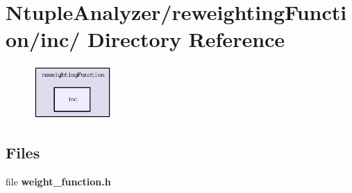\section{Ntuple\-Analyzer/reweighting\-Function/inc/ Directory Reference}
\label{dir_ab643a5a3b726b49372379e775cec85a}


\begin{figure}[H]
\begin{center}
\leavevmode
\includegraphics[width=85pt]{dir_ab643a5a3b726b49372379e775cec85a_dep}
\end{center}
\end{figure}
\subsection*{Files}
\begin{CompactItemize}
\item 
file \textbf{weight\_\-function.h}
\end{CompactItemize}
